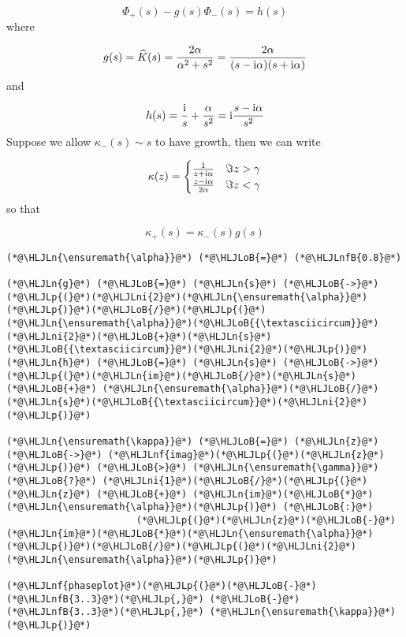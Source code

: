 \documentclass[12pt,landscape]{article}
\newcommand{\HLJLn}[1]{#1}
\newcommand{\HLJLnf}[1]{\textcolor[RGB]{66,102,213}{#1}}
\newcommand{\HLJLnfB}[1]{\textcolor[RGB]{59,151,46}{#1}}
\newcommand{\HLJLni}[1]{\textcolor[RGB]{59,151,46}{#1}}
\newcommand{\HLJLoB}[1]{\textcolor[RGB]{102,102,102}{\textbf{#1}}}
\newcommand{\HLJLp}[1]{#1}
\def\I{ {\rm i} }
\begin{document}
{\[
\Phi_+(s) - g(s) \Phi_-(s) = h(s)
\]
where

\[
g(s) = \widehat K(s) = {2\alpha \over \alpha^2 +s^2}= {2 \alpha \over (s-\I \alpha)(s+\I \alpha)}
\]
and

\[
h(s) = {\I \over s} + {\alpha \over s^2} = \I {s -\I \alpha \over s^2}
\]
Suppose we allow $\kappa_-(s) \sim s$ to have growth, then we can write

\[
\kappa(z) = \begin{cases} {1 \over z+\I \alpha }& \Im z > \gamma \\
                        {z-\I \alpha \over 2 \alpha} & \Im z < \gamma
\end{cases}
\]
so that

\[
\kappa_+(s) = \kappa_-(s) g(s)
\]

\begin{lstlisting}
(*@\HLJLn{\ensuremath{\alpha}}@*) (*@\HLJLoB{=}@*) (*@\HLJLnfB{0.8}@*)

(*@\HLJLn{g}@*) (*@\HLJLoB{=}@*) (*@\HLJLn{s}@*) (*@\HLJLoB{->}@*) (*@\HLJLp{(}@*)(*@\HLJLni{2}@*)(*@\HLJLn{\ensuremath{\alpha}}@*)(*@\HLJLp{)}@*)(*@\HLJLoB{/}@*)(*@\HLJLp{(}@*)(*@\HLJLn{\ensuremath{\alpha}}@*)(*@\HLJLoB{{\textasciicircum}}@*)(*@\HLJLni{2}@*)(*@\HLJLoB{+}@*)(*@\HLJLn{s}@*)(*@\HLJLoB{{\textasciicircum}}@*)(*@\HLJLni{2}@*)(*@\HLJLp{)}@*)
(*@\HLJLn{h}@*) (*@\HLJLoB{=}@*) (*@\HLJLn{s}@*) (*@\HLJLoB{->}@*) (*@\HLJLp{(}@*)(*@\HLJLn{im}@*)(*@\HLJLoB{/}@*)(*@\HLJLn{s}@*) (*@\HLJLoB{+}@*) (*@\HLJLn{\ensuremath{\alpha}}@*)(*@\HLJLoB{/}@*)(*@\HLJLn{s}@*)(*@\HLJLoB{{\textasciicircum}}@*)(*@\HLJLni{2}@*)(*@\HLJLp{)}@*)

(*@\HLJLn{\ensuremath{\kappa}}@*) (*@\HLJLoB{=}@*) (*@\HLJLn{z}@*) (*@\HLJLoB{->}@*) (*@\HLJLnf{imag}@*)(*@\HLJLp{(}@*)(*@\HLJLn{z}@*)(*@\HLJLp{)}@*) (*@\HLJLoB{>}@*) (*@\HLJLn{\ensuremath{\gamma}}@*) (*@\HLJLoB{?}@*) (*@\HLJLni{1}@*)(*@\HLJLoB{/}@*)(*@\HLJLp{(}@*)(*@\HLJLn{z}@*) (*@\HLJLoB{+}@*) (*@\HLJLn{im}@*)(*@\HLJLoB{*}@*)(*@\HLJLn{\ensuremath{\alpha}}@*)(*@\HLJLp{)}@*) (*@\HLJLoB{:}@*)
                       (*@\HLJLp{(}@*)(*@\HLJLn{z}@*)(*@\HLJLoB{-}@*)(*@\HLJLn{im}@*)(*@\HLJLoB{*}@*)(*@\HLJLn{\ensuremath{\alpha}}@*)(*@\HLJLp{)}@*)(*@\HLJLoB{/}@*)(*@\HLJLp{(}@*)(*@\HLJLni{2}@*)(*@\HLJLn{\ensuremath{\alpha}}@*)(*@\HLJLp{)}@*)

(*@\HLJLnf{phaseplot}@*)(*@\HLJLp{(}@*)(*@\HLJLoB{-}@*)(*@\HLJLnfB{3..3}@*)(*@\HLJLp{,}@*) (*@\HLJLoB{-}@*)(*@\HLJLnfB{3..3}@*)(*@\HLJLp{,}@*) (*@\HLJLn{\ensuremath{\kappa}}@*)(*@\HLJLp{)}@*)
\end{lstlisting}

}
\end{document}
